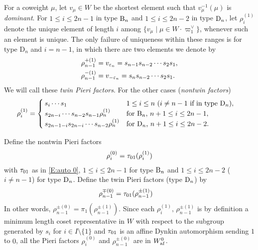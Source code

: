 \documentclass[a4paper]{amsart}
\newcommand{\koushik}[1]{\todo[size=\tiny,color=green!30]{#1}}
\theoremstyle{remark}
\numberwithin{equation}{section}
\begin{document}
For a coweight $\mu$, let $v_\mu\in W$ be the shortest element such that $v_\mu^{-1}(\mu)$ is \emph{dominant}.
For $1\le i\le 2n-1$ in type $\mathrm{B}_{n}$ and
$1\le i\le 2n-2$ in type $\mathrm{D}_{n}$, let $\rho_i^{(1)}$
denote the unique element of length $i$ among
$\{v_\mu\mid \mu\in W\cdot\varpi_1^\lor\}$,
whenever such an element is unique.
The only failure of uniqueness within these ranges is for type $\mathrm{D}_n$ and $i=n-1$, in which there are two elements we denote by
\begin{align}\label{E:two Pieri factors}
\rho_{n-1}^{+(1)} &= v_{\varepsilon_n} = s_{n-1} s_{n-2}\dotsm s_2 s_1, \\
\rho_{n-1}^{-(1)} &= v_{-\varepsilon_n} = s_n s_{n-2} \dotsm s_2 s_1.
\end{align}
We will call these \emph{twin Pieri factors}. For the other cases (\emph{nontwin factors})
\begin{align}
  \rho^{(1)}_i &= 
  \begin{cases}
      s_i \dotsm s_1&\text{$1\le i\le n$}\,\,(\text{$i\ne n-1$ if in type $\mathrm{D}_{n}$}), \\
      s_{2n-i}\dotsm s_{n-2} s_{n-1}\rho^{(1)}_n&\text{for $\mathrm{B}_{n}$, $n+1\le i\le 2n-1$},\\
       s_{2n-1-i} s_{2n-i}\dotsm s_{n-2} \rho^{(1)}_n &\text{for $\mathrm{D}_{n}$, $n+1\le i\le 2n-2$.}
  \end{cases}
\end{align}

Define the nontwin Pieri factors 
\begin{align}\label{E:Pieri factors}
  \rho_i ^{(0)}= \tau_{01}(\rho_i^{(1)})
\end{align}
with $\tau_{01}$ as in \eqref{E:auto 0}, $1\le i\le 2n-1$ for type $\mathrm{B}_{n}$ and $1\le i\le 2n-2$ ($i\ne n-1$) for type $\mathrm{D}_{n}$.
Define the twin Pieri factors (type $\mathrm{D}_{n}$) by
\begin{align}\label{E:twin Pieri factors}
\rho_{n-1}^{\mp(0)} &= \tau_{01}(\rho_{n-1}^{\pm(1)})
\end{align}
 In other words, $\rho_{n-1}^{\pm(0)} = \pi_1(\rho_{n-1}^{\pm(1)})$.
Since each $\rho_i^{(1)},\,\rho_{n-1}^{\pm (1)}$ is by definition a minimum length coset representative in $W$
with respect to the subgroup generated by $s_i$ for $i\in I\setminus\{1\}$ and $\tau_{01}$ is an affine Dynkin automorphism sending $1$ to $0$, all the Pieri factors $\rho_i^{(0)}$ and $\rho_{n-1}^{\pm(0)}$ are in $W_{\mathrm{af}}^0$. 
\end{document}
